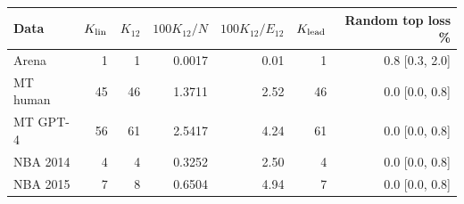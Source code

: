 \begin{tabular}{lrrrrrr}
\toprule
Data & $K_{\rm lin}$ & $K_{12}$ & $100K_{12}/N$ & $100K_{12}/E_{12}$ & $K_{\rm lead}$ & Random top loss \% \\
\midrule
Arena & 1 & 1 & 0.0017 & 0.01 & 1 & 0.8 [0.3, 2.0] \\
MT human & 45 & 46 & 1.3711 & 2.52 & 46 & 0.0 [0.0, 0.8] \\
MT GPT-4 & 56 & 61 & 2.5417 & 4.24 & 61 & 0.0 [0.0, 0.8] \\
NBA 2014 & 4 & 4 & 0.3252 & 2.50 & 4 & 0.0 [0.0, 0.8] \\
NBA 2015 & 7 & 8 & 0.6504 & 4.94 & 7 & 0.0 [0.0, 0.8] \\
\bottomrule
\end{tabular}
